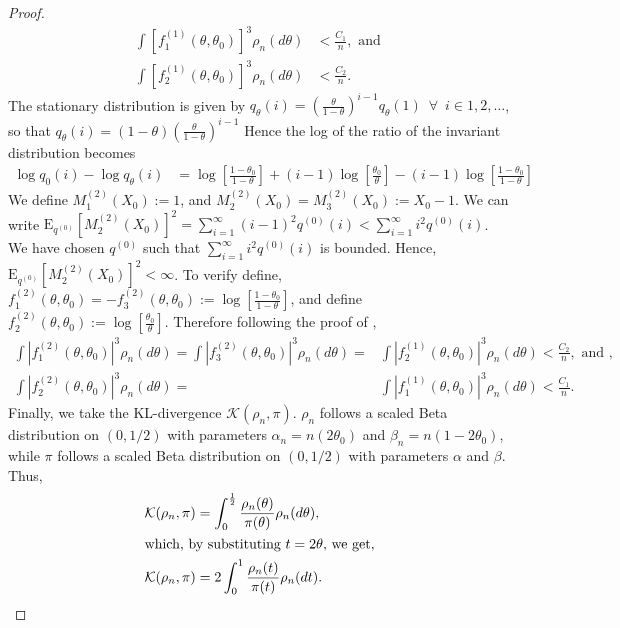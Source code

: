 \documentclass[11pt]{amsart}
\newcommand{\E}{\mathrm{E}}
\begin{document}
\begin{proof}
\begin{align*}
     \int [f^{(1)}_1(\theta,\theta_0)]^3 \rho_n(d\theta) & <\frac{C_1}{n}, \text{ and }\\
     \int [f^{(1)}_2(\theta,\theta_0)]^3 \rho_n(d\theta) & < \frac{C_2}{n}.
\end{align*}
The stationary distribution is given by $q_{\theta}(i)=(\frac{\theta}{1-\theta})^{i-1} q_{\theta}(1)\enspace\forall\enspace i\in {1,2,\dots}$, so that $q_{\theta}(i)= (1-\theta)(\frac{\theta}{1-\theta})^{i-1}$  Hence the log of the ratio of the invariant distribution becomes
\begin{align}
    \log q_{0}(i)-\log q_{\theta}(i) & = \log\left[\frac{1-\theta_0}{1-\theta}\right]+(i-1)\log\left[\frac{\theta_0}{\theta}\right]-(i-1)\log\left[\frac{1-\theta_0}{1-\theta}\right]
\end{align}
We define $M^{(2)}_1(X_0):=1$, and $M^{(2)}_2(X_0)=M^{(2)}_3(X_0):=X_0-1$. We can write $\E_{q^{(0)}} [M^{(2)}_2(X_0)]^2 = \sum_{i=1}^{\infty} (i-1)^2 q^{(0)}(i)< \sum_{i=1}^{\infty} i^2 q^{(0)}(i)$. We have chosen $q^{(0)}$ such that $\sum_{i=1}^{\infty} i^2 q^{(0)}(i)$ is bounded. Hence, $\E_{q^{(0)}} [M^{(2)}_2(X_0)]^2 <\infty$. To verify  define,
$f^{(2)}_1(\theta,\theta_0)=-f^{(2)}_3(\theta,\theta_0):=\log\left[\frac{1-\theta_0}{1-\theta}\right]$, and define $f^{(2)}_2(\theta,\theta_0):=\log\left[\frac{\theta_0}{\theta}\right]$. Therefore following the proof of ,
\begin{align*}
    \int |f^{(2)}_1(\theta,\theta_0)|^3 \rho_n(d\theta)=\int |f^{(2)}_3(\theta,\theta_0)|^3 \rho_n(d\theta) = & \int |f^{(1)}_2(\theta,\theta_0)|^3\rho_n(d\theta)<\frac{C_2}{n}, \text{ and },\\ 
    \int |f^{(2)}_2(\theta,\theta_0)|^3 \rho_n(d\theta) = & \int |f^{(1)}_1(\theta,\theta_0)|^3 \rho_n(d\theta)<\frac{C_1}{n}.
\end{align*}
Finally, we take the KL-divergence $\mathcal{K}(\rho_n,\pi)$. $\rho_n$ follows a scaled Beta distribution on $(0,1/2)$ with parameters $\alpha_n=n(2\theta_0)$ and $\beta_n=n(1-2\theta_0)$, while $\pi$ follows a scaled Beta distribution on $(0,1/2)$ with parameters $\alpha$ and $\beta$. Thus,
\begin{align*}
    \mathcal{K}(\rho_n,\pi) & = \int_0^{\frac{1}{2}} \frac{\rho_n(\theta)}{\pi(\theta)} \rho_n(d\theta),\\
    \intertext{which, by substituting $t=2\theta$, we get,}
    \mathcal{K}(\rho_n,\pi) & = 2\int_0^{1} \frac{\rho_n(t)}{\pi(t)} \rho_n(dt).
\end{align*}

\end{proof}
\end{document}
